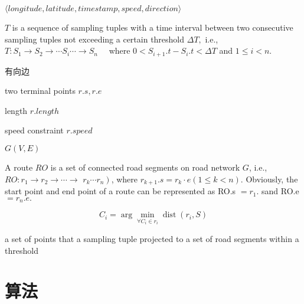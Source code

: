 \begin{definition}
    $\langle longitude, latitude, timestamp, speed,direction \rangle$
\end{definition}

\begin{definition}
    $ T $ is a sequence of sampling tuples with a time interval between two consecutive sampling tuples not exceeding a certain threshold $ \Delta T,  $ i.e., $ T: S_{1} \longrightarrow S_{2} \longrightarrow \cdots S_{i} \cdots \longrightarrow S_{n} \quad $ where $ 0<S_{i+1} . t-S_{i} . t<\Delta T $ and $ 1 \leq i<n . $ 
\end{definition}

\begin{definition}
    有向边

    two terminal points $r.s, r.e$

    length $r.length$

    speed constraint $r.speed$
\end{definition}

\begin{definition}
    $G(V,E)$
\end{definition}

\begin{definition}[route]
    A route $RO$ is a set of connected road segments on road network $ G $, i.e., $ R O: r_{1} \longrightarrow r_{2} \longrightarrow \cdots \longrightarrow $ $ \left.r_{k} \cdots r_{n}\right) $, where $ r_{k+1} . s=r_{k} \cdot e(1 \leq k<n) $. Obviously, the start point and end point of a route can be represented as RO.s $ =r_{1} . $ sand RO.e $ =r_{n} . e . $
\end{definition}

\begin{definition}
    \begin{equation} C_{i}=\arg \min _{\forall C_{i} \in r_{i}} \operatorname{dist}\left(r_{i}, S\right) \end{equation}
\end{definition}

\begin{definition}
    a set of points that a sampling tuple projected to a set of road segments within a threshold
\end{definition}

\section{算法}

